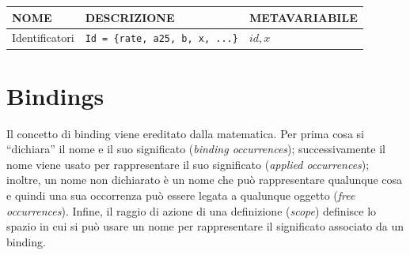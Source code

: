 \documentclass[a4paper,oneside,titlepage]{book}
\begin{document}
\noindent
\begin{center}
	\begin{tabular}{lll}
		\toprule
		\textbf{NOME} & \textbf{DESCRIZIONE} & \textbf{METAVARIABILE} \\
		\midrule
		Identificatori & \lstinline|Id = {rate, a25, b, x, ...}| &  $ id, x $ \\
		\bottomrule
	\end{tabular}
\end{center}

\section{Bindings}
Il concetto di binding viene ereditato dalla matematica. Per prima cosa si ``dichiara'' il nome e il suo significato (\textit{binding occurrences}); successivamente il nome viene usato per rappresentare il suo significato (\textit{applied occurrences}); inoltre, un nome non dichiarato è un nome che può rappresentare qualunque cosa e quindi una sua occorrenza può essere legata a qualunque oggetto (\textit{free occurrences}). Infine, il raggio di azione di una definizione (\textit{scope}) definisce lo spazio in cui si può usare un nome per rappresentare il significato associato da un binding.
\newpage
\end{document}
